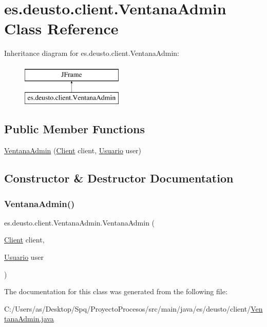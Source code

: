 \hypertarget{classes_1_1deusto_1_1client_1_1_ventana_admin}{}\section{es.\+deusto.\+client.\+Ventana\+Admin Class Reference}
\label{classes_1_1deusto_1_1client_1_1_ventana_admin}
Inheritance diagram for es.\+deusto.\+client.\+Ventana\+Admin\+:\begin{figure}[H]
\begin{center}
\leavevmode
\includegraphics[height=2.000000cm]{classes_1_1deusto_1_1client_1_1_ventana_admin}
\end{center}
\end{figure}
\subsection*{Public Member Functions}
\begin{DoxyCompactItemize}
\item 
\mbox{\hyperlink{classes_1_1deusto_1_1client_1_1_ventana_admin_a227953608a252f1fc239c3392163f3f4}{Ventana\+Admin}} (\mbox{\hyperlink{classes_1_1deusto_1_1client_1_1_client}{Client}} client, \mbox{\hyperlink{classes_1_1deusto_1_1server_1_1jdo_1_1_usuario}{Usuario}} user)
\end{DoxyCompactItemize}


\subsection{Constructor \& Destructor Documentation}
\mbox{\label{classes_1_1deusto_1_1client_1_1_ventana_admin_a227953608a252f1fc239c3392163f3f4}} 
\subsubsection{\texorpdfstring{VentanaAdmin()}{VentanaAdmin()}}
{\footnotesize\ttfamily es.\+deusto.\+client.\+Ventana\+Admin.\+Ventana\+Admin (\begin{DoxyParamCaption}\item[{\mbox{\hyperlink{classes_1_1deusto_1_1client_1_1_client}{Client}}}]{client,  }\item[{\mbox{\hyperlink{classes_1_1deusto_1_1server_1_1jdo_1_1_usuario}{Usuario}}}]{user }\end{DoxyParamCaption})}



The documentation for this class was generated from the following file\+:\begin{DoxyCompactItemize}
\item 
C\+:/\+Users/as/\+Desktop/\+Spq/\+Proyecto\+Procesos/src/main/java/es/deusto/client/\mbox{\hyperlink{_ventana_admin_8java}{Ventana\+Admin.\+java}}\end{DoxyCompactItemize}
